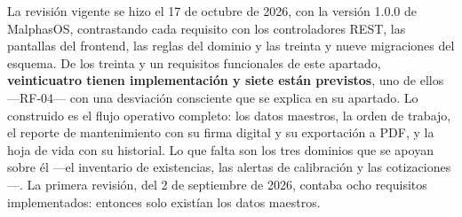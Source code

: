\documentclass[12pt,a4paper]{article}
\begin{document}
La revisión vigente se hizo el 17 de octubre de 2026, con la versión 1.0.0 de MalphasOS, contrastando cada requisito con los controladores REST, las pantallas del frontend, las reglas del dominio y las treinta y nueve migraciones del esquema. De los treinta y un requisitos funcionales de este apartado, \textbf{veinticuatro tienen implementación y siete están previstos}, uno de ellos —RF-04— con una desviación consciente que se explica en su apartado. Lo construido es el flujo operativo completo: los datos maestros, la orden de trabajo, el reporte de mantenimiento con su firma digital y su exportación a PDF, y la hoja de vida con su historial. Lo que falta son los tres dominios que se apoyan sobre él —el inventario de existencias, las alertas de calibración y las cotizaciones—. La primera revisión, del 2 de septiembre de 2026, contaba ocho requisitos implementados: entonces solo existían los datos maestros.
\end{document}
